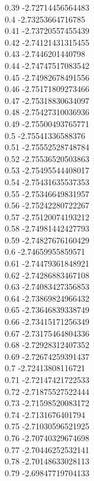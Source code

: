 {0.39	-2.72714456564483\\
0.4	-2.73253664716785\\
0.41	-2.73720557455439\\
0.42	-2.74121431315455\\
0.43	-2.7446201440798\\
0.44	-2.74747517083542\\
0.45	-2.74982678491556\\
0.46	-2.75171809273466\\
0.47	-2.75318830634097\\
0.48	-2.75427310036936\\
0.49	-2.75500493765771\\
0.5	-2.75541336588376\\
0.51	-2.75552528748784\\
0.52	-2.75536520503863\\
0.53	-2.75495544408017\\
0.54	-2.75431635537353\\
0.55	-2.75346649831957\\
0.56	-2.75242280722267\\
0.57	-2.75120074193212\\
0.58	-2.74981442427793\\
0.59	-2.74827676160429\\
0.6	-2.74659955859571\\
0.61	-2.74479361848921\\
0.62	-2.74286883467108\\
0.63	-2.74083427356853\\
0.64	-2.73869824966432\\
0.65	-2.73646839338749\\
0.66	-2.73415171256349\\
0.67	-2.73175464804336\\
0.68	-2.72928312407352\\
0.69	-2.72674259391437\\
0.7	-2.72413808116721\\
0.71	-2.72147421722533\\
0.72	-2.71875527522444\\
0.73	-2.71598520083172\\
0.74	-2.7131676401794\\
0.75	-2.71030596521925\\
0.76	-2.70740329674698\\
0.77	-2.70446252532141\\
0.78	-2.70148633028113\\
0.79	-2.69847719704133\\
}
